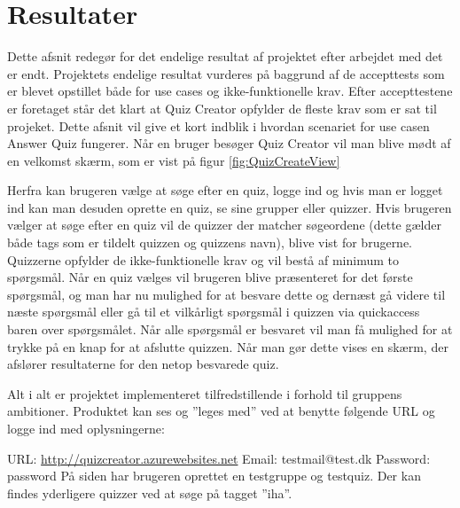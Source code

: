 \section{Resultater}
Dette afsnit redegør for det endelige resultat af projektet efter arbejdet med det er endt. Projektets endelige resultat vurderes på baggrund af de accepttests som er blevet opstillet både for use cases og ikke-funktionelle krav. Efter accepttestene er foretaget står det klart at Quiz Creator opfylder de fleste krav som er sat til projeket. Dette afsnit vil give et kort indblik i hvordan scenariet for use casen Answer Quiz fungerer. Når en bruger besøger Quiz Creator vil man blive mødt af en velkomst skærm, som er vist på figur \ref{fig:QuizCreateView}


Herfra kan brugeren vælge at søge efter en quiz, logge ind og hvis man er logget ind kan man desuden oprette en quiz, se sine grupper eller quizzer. Hvis brugeren vælger at søge efter en quiz vil de quizzer der matcher søgeordene (dette gælder både tags som er tildelt quizzen og quizzens navn), blive vist for brugerne. Quizzerne opfylder de ikke-funktionelle krav og vil bestå af minimum to spørgsmål. Når en quiz vælges vil brugeren blive præsenteret for det første spørgsmål, og man har nu mulighed for at besvare dette og dernæst gå videre til næste spørgsmål eller gå til et vilkårligt spørgsmål i quizzen via quickaccess baren over spørgsmålet. Når alle spørgsmål er besvaret vil man få mulighed for at trykke på en knap for at afslutte quizzen. Når man gør dette vises en skærm, der afslører resultaterne for den netop besvarede quiz.

Alt i alt er projektet implementeret tilfredstillende i forhold til gruppens ambitioner.
Produktet kan ses og ''leges med'' ved at benytte følgende URL og logge ind med oplysningerne:

URL: \url{http://quizcreator.azurewebsites.net} \newline
Email: testmail@test.dk \newline
Password: password \newline
På siden har brugeren oprettet en testgruppe og testquiz. Der kan findes yderligere quizzer ved at søge på tagget ''iha''.
 

